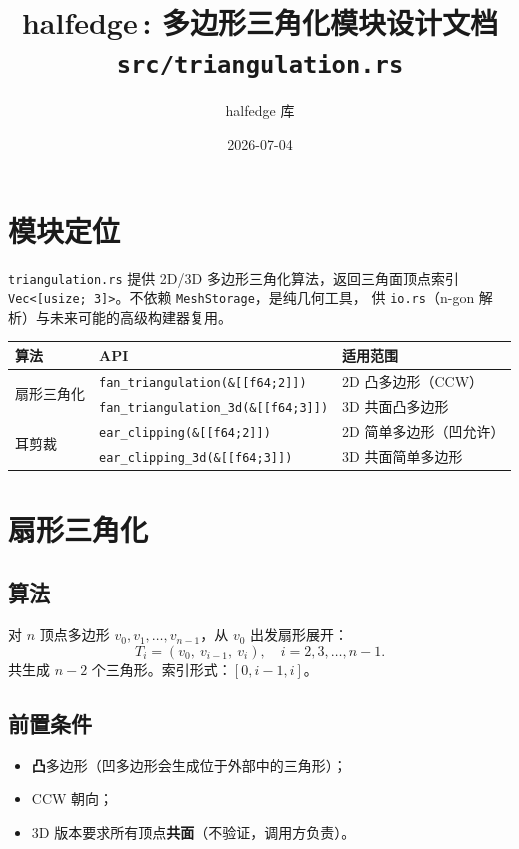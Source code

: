 \documentclass[11pt,a4paper]{article}
\title{\textbf{halfedge\,: 多边形三角化模块设计文档} \\ \large \texttt{src/triangulation.rs}}
\author{halfedge 库}
\date{2026-07-04}
\begin{document}
\maketitle
\tableofcontents

\section{模块定位}

\texttt{triangulation.rs} 提供 2D/3D 多边形三角化算法，返回三角面顶点索引
\texttt{Vec<[usize; 3]>}。不依赖 \texttt{MeshStorage}，是纯几何工具，
供 \texttt{io.rs}（n-gon 解析）与未来可能的高级构建器复用。

\begin{center}
\renewcommand{\arraystretch}{1.18}
\begin{tabular}{@{}lll@{}}
  \toprule
  \textbf{算法} & \textbf{API} & \textbf{适用范围} \\
  \midrule
  \multirow{2}{*}{扇形三角化}
    & \texttt{fan\_triangulation(\&[[f64;2]])}    & 2D 凸多边形（CCW） \\
    & \texttt{fan\_triangulation\_3d(\&[[f64;3]])} & 3D 共面凸多边形 \\
  \midrule
  \multirow{2}{*}{耳剪裁}
    & \texttt{ear\_clipping(\&[[f64;2]])}         & 2D 简单多边形（凹允许） \\
    & \texttt{ear\_clipping\_3d(\&[[f64;3]])}     & 3D 共面简单多边形 \\
  \bottomrule
\end{tabular}
\end{center}

\section{扇形三角化}

\subsection{算法}

对 $n$ 顶点多边形 $v_0, v_1, \dots, v_{n-1}$，从 $v_0$ 出发扇形展开：
\[
  T_i = (v_0,\ v_{i-1},\ v_i),\quad i = 2, 3, \dots, n-1.
\]
共生成 $n - 2$ 个三角形。索引形式：$[0, i-1, i]$。

\subsection{前置条件}

\begin{itemize}
  \item \textbf{凸}多边形（凹多边形会生成位于外部中的三角形）；
  \item CCW 朝向；
  \item 3D 版本要求所有顶点\textbf{共面}（不验证，调用方负责）。
\end{itemize}
\end{document}
